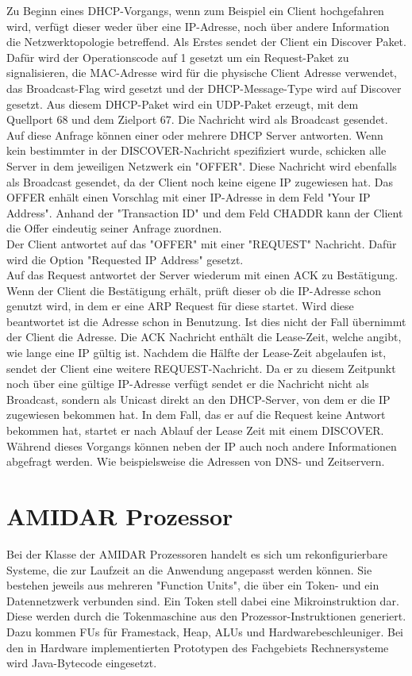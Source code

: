 Zu Beginn eines DHCP-Vorgangs, wenn zum Beispiel ein Client hochgefahren wird, verfügt dieser weder über eine IP-Adresse, noch über andere Information die Netzwerktopologie betreffend. Als Erstes sendet der Client ein Discover Paket. Dafür wird der Operationscode auf 1 gesetzt um ein Request-Paket zu signalisieren, die MAC-Adresse wird für die physische Client Adresse verwendet, das Broadcast-Flag wird gesetzt und der DHCP-Message-Type wird auf Discover gesetzt. Aus diesem DHCP-Paket wird ein UDP-Paket erzeugt, mit dem Quellport  68 und dem Zielport 67. Die Nachricht wird als Broadcast gesendet. \\
Auf diese Anfrage können einer oder mehrere DHCP Server antworten. Wenn kein bestimmter in der DISCOVER-Nachricht spezifiziert wurde, schicken alle Server in dem jeweiligen Netzwerk ein "{}OFFER". Diese Nachricht wird ebenfalls als Broadcast gesendet, da der Client noch keine eigene IP zugewiesen hat. Das OFFER enhält einen Vorschlag mit einer IP-Adresse in dem Feld "Your IP Address". Anhand der "Transaction ID"{} und dem Feld CHADDR kann der Client die Offer eindeutig seiner Anfrage zuordnen. \\
Der Client antwortet auf das "{}OFFER"{} mit einer {}"REQUEST"{} Nachricht. Dafür wird die Option "Requested IP Address"{} gesetzt. \\
Auf das Request antwortet der Server wiederum mit einen ACK zu Bestätigung. Wenn der Client die Bestätigung erhält, prüft dieser ob die IP-Adresse schon genutzt wird, in dem er eine ARP Request für diese startet. Wird diese beantwortet ist die Adresse schon in Benutzung. Ist dies nicht der Fall übernimmt der Client die Adresse. 
Die ACK Nachricht enthält die Lease-Zeit, welche angibt, wie lange eine IP gültig ist. 
Nachdem die Hälfte der Lease-Zeit abgelaufen ist, sendet der Client eine weitere REQUEST-Nachricht. Da er zu diesem Zeitpunkt noch über eine gültige IP-Adresse verfügt sendet er die Nachricht nicht als Broadcast, sondern als Unicast direkt an den DHCP-Server, von dem er die IP zugewiesen bekommen hat. In dem Fall, das er auf die Request keine Antwort bekommen hat, startet er nach Ablauf der Lease Zeit mit einem DISCOVER.\\
Während dieses Vorgangs können neben der IP auch noch andere Informationen abgefragt werden. Wie beispielsweise die Adressen von DNS- und Zeitservern.




\section{AMIDAR Prozessor}
Bei der Klasse der AMIDAR Prozessoren handelt es sich um rekonfigurierbare Systeme, die zur Laufzeit an die Anwendung angepasst werden können. Sie bestehen jeweils aus mehreren {}"Function Units"{}, die über ein Token- und ein Datennetzwerk verbunden sind. Ein Token stell dabei eine Mikroinstruktion dar. Diese werden durch die Tokenmaschine aus den Prozessor-Instruktionen generiert. Dazu kommen FUs für Framestack, Heap, ALUs und Hardwarebeschleuniger. Bei den in Hardware implementierten Prototypen des Fachgebiets Rechnersysteme wird Java-Bytecode eingesetzt.

